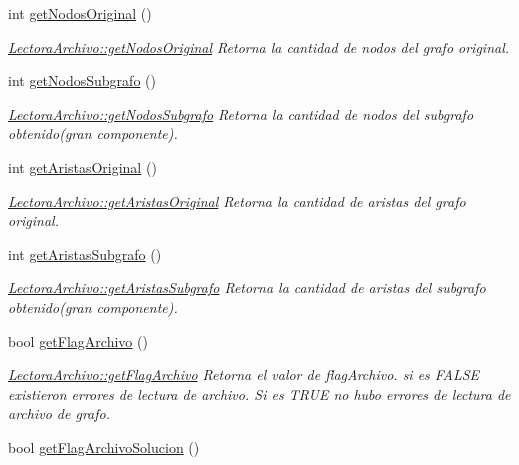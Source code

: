 \begin{DoxyCompactItemize}
int \hyperlink{class_lectora_archivo_a7ab5551369ff9750f3273ded4c71fa5d}{get\-Nodos\-Original} ()
\begin{DoxyCompactList}\small\item\em \hyperlink{class_lectora_archivo_a7ab5551369ff9750f3273ded4c71fa5d}{Lectora\-Archivo\-::get\-Nodos\-Original} Retorna la cantidad de nodos del grafo original. \end{DoxyCompactList}\item 
int \hyperlink{class_lectora_archivo_ac9717ec799f975e480c8c37a33f06b09}{get\-Nodos\-Subgrafo} ()
\begin{DoxyCompactList}\small\item\em \hyperlink{class_lectora_archivo_ac9717ec799f975e480c8c37a33f06b09}{Lectora\-Archivo\-::get\-Nodos\-Subgrafo} Retorna la cantidad de nodos del subgrafo obtenido(gran componente). \end{DoxyCompactList}\item 
int \hyperlink{class_lectora_archivo_ac7b9cf410afa1eb5ea0c068ebfaa26f5}{get\-Aristas\-Original} ()
\begin{DoxyCompactList}\small\item\em \hyperlink{class_lectora_archivo_ac7b9cf410afa1eb5ea0c068ebfaa26f5}{Lectora\-Archivo\-::get\-Aristas\-Original} Retorna la cantidad de aristas del grafo original. \end{DoxyCompactList}\item 
int \hyperlink{class_lectora_archivo_a68a43abd1d057194c134d937a97d30e7}{get\-Aristas\-Subgrafo} ()
\begin{DoxyCompactList}\small\item\em \hyperlink{class_lectora_archivo_a68a43abd1d057194c134d937a97d30e7}{Lectora\-Archivo\-::get\-Aristas\-Subgrafo} Retorna la cantidad de aristas del subgrafo obtenido(gran componente). \end{DoxyCompactList}\item 
bool \hyperlink{class_lectora_archivo_aa0688f5f52c905598e4dc152e4553e51}{get\-Flag\-Archivo} ()
\begin{DoxyCompactList}\small\item\em \hyperlink{class_lectora_archivo_aa0688f5f52c905598e4dc152e4553e51}{Lectora\-Archivo\-::get\-Flag\-Archivo} Retorna el valor de flag\-Archivo. si es F\-A\-L\-S\-E existieron errores de lectura de archivo. Si es T\-R\-U\-E no hubo errores de lectura de archivo de grafo. \end{DoxyCompactList}\item 
bool \hyperlink{class_lectora_archivo_aa59f0d1c56b4d073e07ec495439738f6}{get\-Flag\-Archivo\-Solucion} ()

\end{DoxyCompactItemize}
